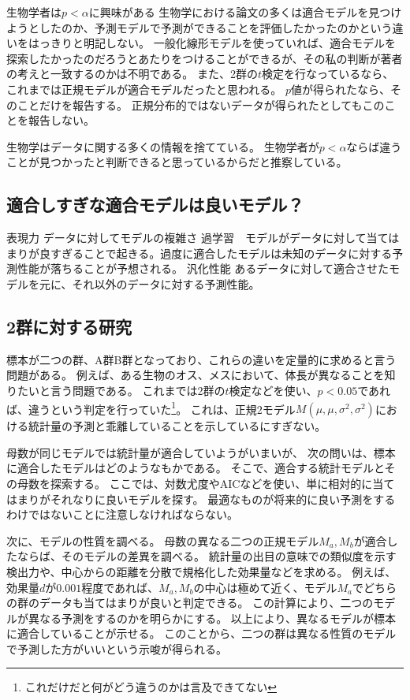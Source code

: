 \begin{SMbox}{生物学者は$p<\alpha$に興味がある}
    生物学における論文の多くは適合モデルを見つけようとしたのか、予測モデルで予測ができることを評価したかったのかという違いをはっきりと明記しない。
    一般化線形モデルを使っていれば、適合モデルを探索したかったのだろうとあたりをつけることができるが、その私の判断が著者の考えと一致するのかは不明である。
    また、2群の$t$検定を行なっているなら、これまでは正規モデルが適合モデルだったと思われる。
    $p$値が得られたなら、そのことだけを報告する。
    正規分布的ではないデータが得られたとしてもこのことを報告しない。

    生物学はデータに関する多くの情報を捨てている。
    生物学者が$p<\alpha$ならば違うことが見つかったと判断できると思っているからだと推察している。
\end{SMbox}

\subsection{適合しすぎな適合モデルは良いモデル？}%

表現力 データに対してモデルの複雑さ
過学習　モデルがデータに対して当てはまりが良すぎることで起きる。過度に適合したモデルは未知のデータに対する予測性能が落ちることが予想される。
汎化性能 あるデータに対して適合させたモデルを元に、それ以外のデータに対する予測性能。

\subsection{2群に対する研究}
標本が二つの群、A群B群となっており、これらの違いを定量的に求めると言う問題がある。
例えば、ある生物のオス、メスにおいて、体長が異なることを知りたいと言う問題である。
これまでは2群の$t$検定などを使い、$p<0.05$であれば、違うという判定を行っていた\footnote{これだけだと何がどう違うのかは言及できてない}。
これは、正規2モデル$M(\mu,\mu,\sigma^2,\sigma^2)$における統計量の予測と乖離していることを示しているにすぎない。

母数が同じモデルでは統計量が適合していようがいまいが、
次の問いは、標本に適合したモデルはどのようなもかである。
そこで、適合する統計モデルとその母数を探索する。
ここでは、対数尤度やAICなどを使い、単に相対的に当てはまりがそれなりに良いモデルを探す。
最適なものが将来的に良い予測をするわけではないことに注意しなければならない。

次に、モデルの性質を調べる。
母数の異なる二つの正規モデル$M_a,M_b$が適合したならば、そのモデルの差異を調べる。
統計量の出目の意味での類似度を示す検出力や、中心からの距離を分散で規格化した効果量などを求める。
例えば、効果量$d$が$0.001$程度であれば、$M_a,M_b$の中心は極めて近く、モデル$M_a$でどちらの群のデータも当てはまりが良いと判定できる。
この計算により、二つのモデルが異なる予測をするのかを明らかにする。
以上により、異なるモデルが標本に適合していることが示せる。
このことから、二つの群は異なる性質のモデルで予測した方がいいという示唆が得られる。

